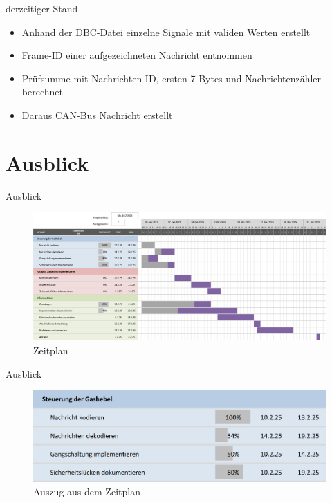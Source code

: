 \documentclass[usenames, dvipsnames, aspectratio=75]{beamer}
\begin{document}
\begin{frame}{derzeitiger Stand}
    \begin{itemize}
        \item Anhand der DBC-Datei einzelne Signale mit validen Werten erstellt
        \item Frame-ID einer aufgezeichneten Nachricht entnommen
        \item Prüfsumme mit Nachrichten-ID, ersten 7 Bytes und Nachrichtenzähler berechnet
        \item Daraus CAN-Bus Nachricht erstellt
    \end{itemize}
    
\end{frame}


\section{Ausblick}
\begin{frame}{Ausblick}
    \begin{figure}
        \centering
        \includegraphics[width=1\linewidth]{assets/Zeitplan.png}
        \caption{Zeitplan}
    \end{figure}
\end{frame}

\begin{frame}{Ausblick}
    \begin{figure}
        \centering
        \includegraphics[width=1\linewidth]{assets/zeitplan1.png}
        \caption{Auszug aus dem Zeitplan}
    \end{figure}
\end{frame}
\end{document}
